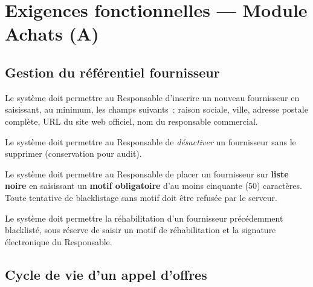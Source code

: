 \documentclass[a4paper,11pt,openany]{report}
\begin{document}
\section{Exigences fonctionnelles --- Module Achats (A)}

\subsection{Gestion du référentiel fournisseur}

\begin{description}[leftmargin=*]
  \item[\texttt{EF-A01} {[B]}] Le système doit permettre au
    Responsable d'inscrire un nouveau fournisseur en saisissant,
    au minimum, les champs suivants~: raison sociale, ville,
    adresse postale complète, URL du site web officiel, nom du
    responsable commercial.
  \item[\texttt{EF-A02} {[B]}] Le système doit permettre au
    Responsable de \emph{désactiver} un fournisseur sans le
    supprimer (conservation pour audit).
  \item[\texttt{EF-A03} {[B]}] Le système doit permettre au
    Responsable de placer un fournisseur sur \textbf{liste noire}
    en saisissant un \textbf{motif obligatoire} d'au moins
    cinquante (50) caractères. Toute tentative de blacklistage
    sans motif doit être refusée par le serveur.
  \item[\texttt{EF-A04} {[E]}] Le système doit permettre la
    réhabilitation d'un fournisseur précédemment blacklisté,
    sous réserve de saisir un motif de réhabilitation et la
    signature électronique du Responsable.
\end{description}

\subsection{Cycle de vie d'un appel d'offres}
\end{document}
